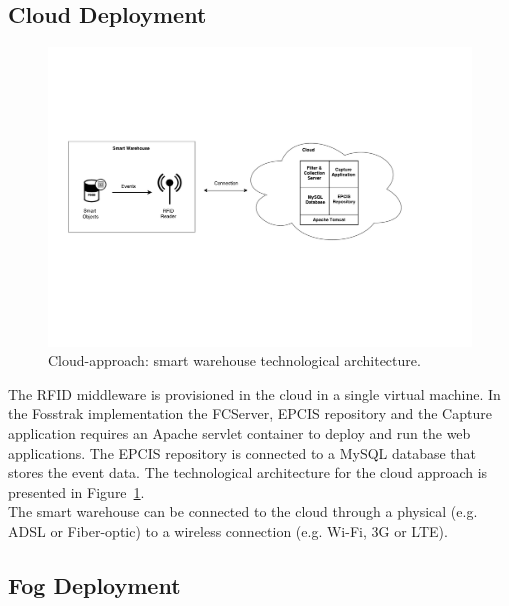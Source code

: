 \subsection{Cloud Deployment}
\label{sub:imp_smart_warehouse_cloud}

\begin{figure}
  \centering
  \includegraphics[width=\textwidth]{./images/implementation_cloud_architecture}
  \caption[Cloud-approach: technological architecture.]{Cloud-approach: smart warehouse technological architecture.}
  \label{fig:implementation_cloud_architecture}
\end{figure}

The \gls{RFID} middleware is provisioned in the cloud in a single virtual machine. In the
Fosstrak implementation the \gls{FCServer}, \gls{EPCIS} repository and the Capture application
requires an Apache servlet container to deploy and run the web applications. The \gls{EPCIS}
repository is connected to a MySQL database that stores the event data. The technological architecture
for the cloud approach is presented in Figure~\ref{fig:implementation_cloud_architecture}.\\

The smart warehouse can be connected to the cloud through a physical (e.g. \gls{ADSL} or Fiber-optic)
to a wireless connection (e.g. Wi-Fi, 3G or \gls{LTE}).

\subsection{Fog Deployment}
\label{sub:imp_smart_warehouse_fog}

